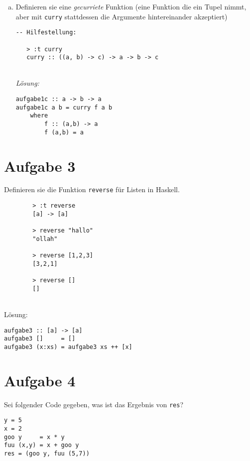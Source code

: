 \documentclass{article}
\begin{document}
\begin{enumerate} [a)]
\newpage

    \item  Definieren sie eine \textit{gecurriete} Funktion (eine Funktion die ein Tupel nimmt, aber mit \texttt{curry} stattdessen die Argumente hintereinander akzeptiert)
        \begin{verbatim}
-- Hilfestellung:

   > :t curry
   curry :: ((a, b) -> c) -> a -> b -> c
        \end{verbatim}
        \hfill \\
        \textit{Lösung:}
        \begin{mdframed}[backgroundcolor=bg]
            \begin{verbatim}
aufgabe1c :: a -> b -> a
aufgabe1c a b = curry f a b
    where
        f :: (a,b) -> a
        f (a,b) = a
            \end{verbatim}
        \end{mdframed}
\end{enumerate}

\section*{Aufgabe 3}
Definieren sie die Funktion \texttt{reverse} für Listen in Haskell.
    \begin{verbatim}
        > :t reverse
        [a] -> [a]

        > reverse "hallo"
        "ollah"
        
        > reverse [1,2,3]
        [3,2,1]
        
        > reverse []
        []
    \end{verbatim}
    \hfill \\

    Lösung:
\begin{mdframed}[backgroundcolor=bg]
    \begin{verbatim}
aufgabe3 :: [a] -> [a]
aufgabe3 []     = []
aufgabe3 (x:xs) = aufgabe3 xs ++ [x]
    \end{verbatim}
\end{mdframed}

\newpage

\section*{Aufgabe 4}
Sei folgender Code gegeben, was ist das Ergebnis von \texttt{res}?
\begin{verbatim}
y = 5
x = 2
goo y     = x * y
fuu (x,y) = x + goo y
res = (goo y, fuu (5,7))
\end{verbatim}
\end{document}

